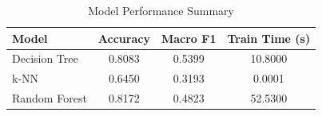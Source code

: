 \begin{table}[htbp]
\centering
\caption{Model Performance Summary}
\label{tab:performance_summary}
\begin{tabular}{lccc}
\toprule
Model & Accuracy & Macro F1 & Train Time (s) \\
\midrule
Decision Tree & 0.8083 & 0.5399 & 10.8000 \\
k-NN & 0.6450 & 0.3193 & 0.0001 \\
Random Forest & 0.8172 & 0.4823 & 52.5300 \\
\bottomrule
\end{tabular}
\end{table}